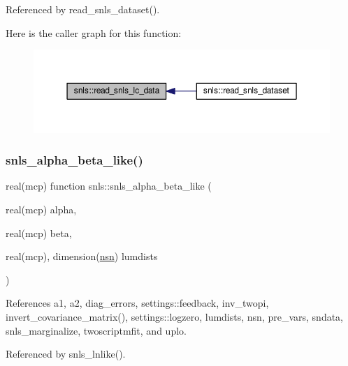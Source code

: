 Referenced by read\+\_\+snls\+\_\+dataset().

Here is the caller graph for this function\+:
\nopagebreak
\begin{figure}[H]
\begin{center}
\leavevmode
\includegraphics[width=350pt]{namespacesnls_a7f1db3cfd4fe644d65ae48d23062420a_icgraph}
\end{center}
\end{figure}
\mbox{\label{namespacesnls_a31b64210643b2a6f625a1925f01c1194}} 
\subsubsection{\texorpdfstring{snls\+\_\+alpha\+\_\+beta\+\_\+like()}{snls\_alpha\_beta\_like()}}
{\footnotesize\ttfamily real(mcp) function snls\+::snls\+\_\+alpha\+\_\+beta\+\_\+like (\begin{DoxyParamCaption}\item[{real(mcp)}]{alpha,  }\item[{real(mcp)}]{beta,  }\item[{real(mcp), dimension(\mbox{\hyperlink{namespacesnls_abc05ea854fb8f639d617703ff33dcf41}{nsn}})}]{lumdists }\end{DoxyParamCaption})\hspace{0.3cm}{\ttfamily [private]}}



References a1, a2, diag\+\_\+errors, settings\+::feedback, inv\+\_\+twopi, invert\+\_\+covariance\+\_\+matrix(), settings\+::logzero, lumdists, nsn, pre\+\_\+vars, sndata, snls\+\_\+marginalize, twoscriptmfit, and uplo.



Referenced by snls\+\_\+lnlike().

